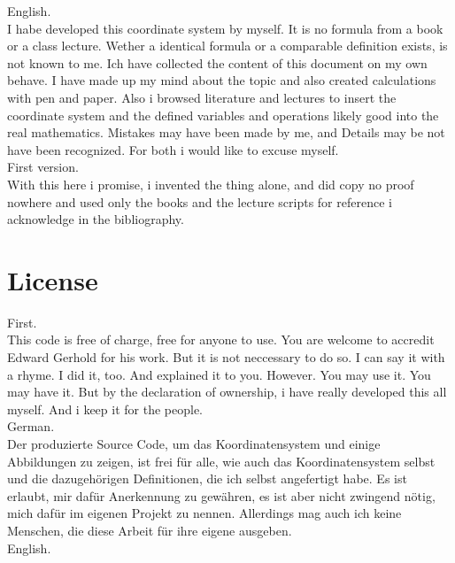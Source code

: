 \documentclass[a4paper]{article}
\begin{document}
\begin{PropositionOpt4}
English.\\

I habe developed this coordinate system by myself. It is no formula from a book or a class lecture. 
Wether a identical formula or a comparable definition exists, is not known to me.
Ich have collected the content of this document on my own behave. I have made up my mind about the topic
and also created calculations with pen and paper. Also i browsed literature and lectures to insert the
coordinate system and the defined variables and operations likely good into the real mathematics.
Mistakes may have been made by me, and Details may be not have been recognized. For both i would like 
to excuse myself.\\

First version.\\

With this here i promise, i invented the thing alone, and did copy no proof nowhere and used only
the books and the lecture scripts for reference i acknowledge in the bibliography.\\

\section{License}

First.\\

This code is free of charge, free for anyone to use. You are welcome to accredit Edward Gerhold for his work.
But it is not neccessary to do so. I can say it with a rhyme. I did it, too. And explained it to you. However.
You may use it. You may have it. But by the declaration of ownership, i have really developed this all myself.
And i keep it for the people.\\

German. \\

Der produzierte Source Code, um das Koordinatensystem und einige Abbildungen zu zeigen, ist frei f\"ur alle,
wie auch das Koordinatensystem selbst und die dazugeh\"origen Definitionen, die ich selbst angefertigt habe.
Es ist erlaubt, mir daf\"ur Anerkennung zu gew\"ahren, es ist aber nicht zwingend n\"otig, mich daf\"ur im
eigenen Projekt zu nennen. Allerdings mag auch ich keine Menschen, die diese Arbeit f\"ur ihre eigene ausgeben.\\

English.\\


\end{PropositionOpt4}
\end{document}
